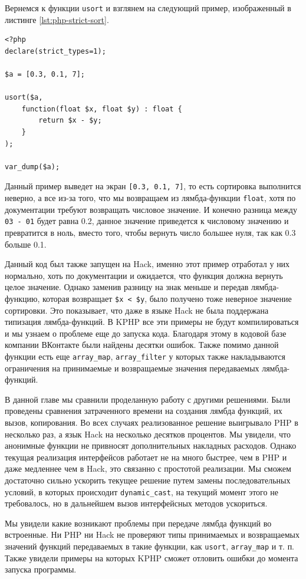 Вернемся к функции \verb|usort| и взглянем на следующий пример, изображенный в листинге \ref{lst:php-strict-sort}.
\begin{lstlisting}[caption={Пример типизации в PHP7}, label={lst:php-strict-type}]
<?php
declare(strict_types=1);

$a = [0.3, 0.1, 7];

usort($a,
    function(float $x, float $y) : float {
        return $x - $y;
    }
);

var_dump($a);
\end{lstlisting}

Данный пример выведет на экран \verb|[0.3, 0.1, 7]|, то есть сортировка выполнится неверно, а все из-за того, что мы возвращаем из лямбда-функции \verb|float|, хотя по документации требуют возвращать числовое значение.
И конечно разница между \verb|03 - 01| будет равна 0.2, данное значение приведется к числовому значению и превратится в ноль, вместо того, чтобы вернуть число большее нуля, так как 0.3 больше 0.1.

Данный код был также запущен на Hack, именно этот пример отработал у них нормально, хоть по документации и ожидается, что функция должна вернуть целое значение.
Однако заменив разницу на знак меньше и передав лямбда-функцию, которая возвращает \verb|$x < $y|, было получено тоже неверное значение сортировки.
Это показывает, что даже в языке Hack не была поддержана типизация лямбда-функций.
В KPHP все эти примеры не будут компилироваться и мы узнаем о проблеме еще до запуска кода.
Благодаря этому в кодовой базе компании ВКонтакте были найдены десятки ошибок.
Также помимо данной функции есть еще \verb|array_map|, \verb|array_filter| у которых также накладываются ограничения на принимаемые и возвращаемые значения передаваемых лямбда-функций.

\chapterconclusion
В данной главе мы сравнили проделанную работу с другими решениями.
Были проведены сравнения затраченного времени на создания лямбда функций, их вызов, копирования.
Во всех случаях реализованное решение выигрывало PHP в несколько раз, а язык Hack на несколько десятков процентов.
Мы увидели, что анонимные функции не привносят дополнительных накладных расходов.
Однако текущая реализация интерфейсов работает не на много быстрее, чем в PHP и даже медленнее чем в Hack, это связанно с простотой реализации.
Мы сможем достаточно сильно ускорить текущее решение путем замены последовательных условий, в которых происходит \verb|dynamic_cast|, на текущий момент этого не требовалось, но в дальнейшем вызов интерфейсных методов ускориться.

Мы увидели какие возникают проблемы при передаче лямбда функций во встроенные.
Ни PHP ни Hack не проверяют типы принимаемых и возвращаемых значений функций передаваемых в такие функции, как \verb|usort|, \verb|array_map| и т. п.
Также увидели примеры на которых KPHP сможет отловить ошибки до момента запуска программы.